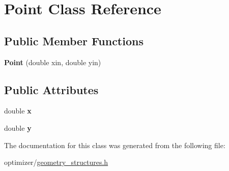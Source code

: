 \hypertarget{class_point}{}\section{Point Class Reference}
\label{class_point}
\subsection*{Public Member Functions}
\begin{DoxyCompactItemize}
\item 
\mbox{\label{class_point_a2a0253a42cde677081c10532edcfc65f}} 
{\bfseries Point} (double xin, double yin)
\end{DoxyCompactItemize}
\subsection*{Public Attributes}
\begin{DoxyCompactItemize}
\item 
\mbox{\label{class_point_ab99c56589bc8ad5fa5071387110a5bc7}} 
double {\bfseries x}
\item 
\mbox{\label{class_point_afa38be143ae800e6ad69ce8ed4df62d8}} 
double {\bfseries y}
\end{DoxyCompactItemize}


The documentation for this class was generated from the following file\+:\begin{DoxyCompactItemize}
\item 
optimizer/\hyperlink{geometry__structures_8h}{geometry\+\_\+structures.\+h}\end{DoxyCompactItemize}
